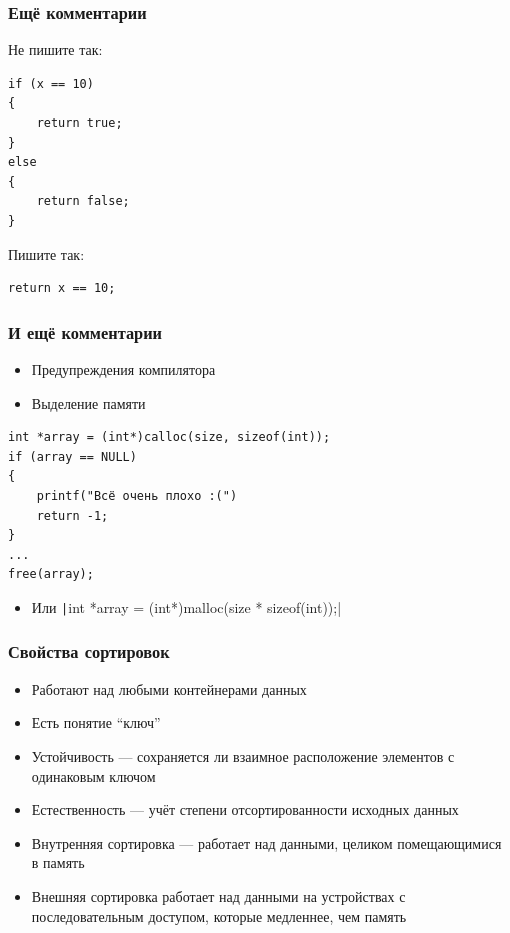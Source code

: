 \documentclass{../../slides-style}
\begin{document}
    \begin{frame}[fragile]
        \frametitle{Ещё комментарии}
        Не пишите так:
        \begin{verbatim}
if (x == 10) 
{
    return true;
}
else
{
    return false;
}
        \end{verbatim}
        Пишите так:
        \begin{verbatim}
return x == 10;
        \end{verbatim}
    \end{frame}

    \begin{frame}[fragile]
        \frametitle{И ещё комментарии}
        \begin{itemize}
            \item Предупреждения компилятора
            \item Выделение памяти
        \end{itemize}
        \begin{verbatim}
int *array = (int*)calloc(size, sizeof(int));
if (array == NULL) 
{
    printf("Всё очень плохо :(")
    return -1;
}
...
free(array);
        \end{verbatim}
        \begin{itemize}
            \item Или \texttt|int *array = (int*)malloc(size * sizeof(int));|
        \end{itemize}
    \end{frame}
    
    \begin{frame}
        \frametitle{Свойства сортировок}
        \begin{itemize}
            \item Работают над любыми контейнерами данных
            \item Есть понятие ``ключ''
            \item Устойчивость --- сохраняется ли взаимное расположение элементов с одинаковым ключом
            \item Естественность --- учёт степени отсортированности исходных данных
            \item Внутренняя сортировка --- работает над данными, целиком помещающимися в память
            \item Внешняя сортировка работает над данными на устройствах с последовательным доступом, которые медленнее, чем память
        \end{itemize}
    \end{frame}
\end{document}
